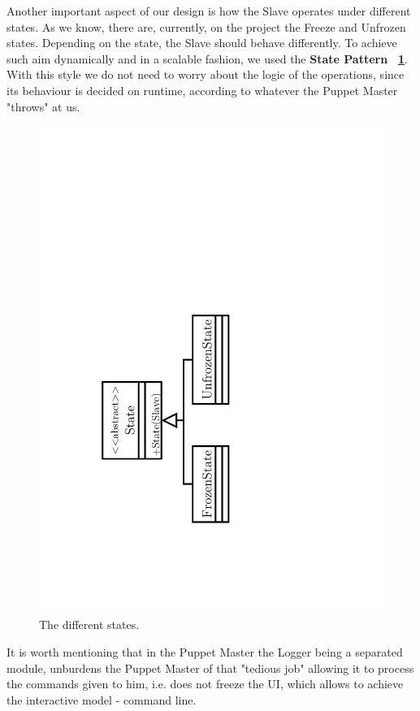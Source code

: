 \documentclass[times, 10pt,twocolumn]{article}
\begin{document}
Another important aspect of our design is how the Slave operates under different states. As we know, there are, currently, on the project the Freeze and Unfrozen states. Depending on the state, the Slave should behave differently. To achieve such aim dynamically and in a scalable fashion, we used the \textbf{State Pattern} \textbf{~\cref{fig:state}}. With this style we do not need to worry about the logic of the operations, since its behaviour is decided on runtime, according to whatever the Puppet Master "throws" at us.


\begin{figure}[h]
\centering
	\includegraphics[scale=0.45]{"Architecture/State"}
    \caption{The different states.} 
    \label{fig:state}
\end{figure}


It is worth mentioning that in the Puppet Master the Logger being a separated module, unburdens the Puppet Master of that "tedious job" allowing it to process the commands given to him, i.e. does not freeze the UI, which allows to achieve the interactive model - command line.
\end{document}
